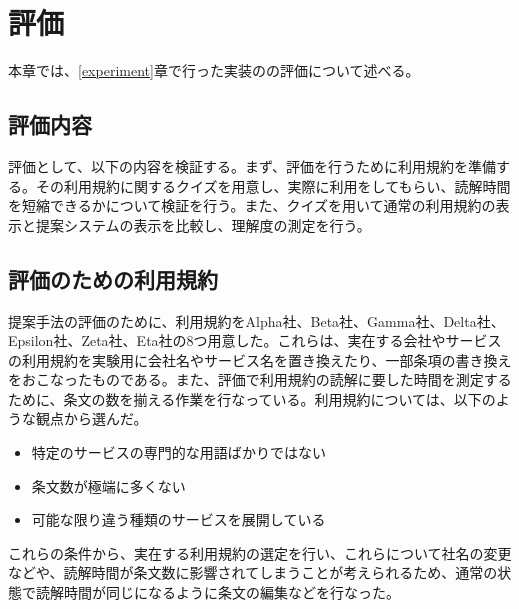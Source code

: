 \chapter{評価}
\label{discussion}
本章では、\ref{experiment}章で行った実装のの評価について述べる。

\section{評価内容}
評価として、以下の内容を検証する。まず、評価を行うために利用規約を準備する。その利用規約に関するクイズを用意し、実際に利用をしてもらい、読解時間を短縮できるかについて検証を行う。また、クイズを用いて通常の利用規約の表示と提案システムの表示を比較し、理解度の測定を行う。

\section{評価のための利用規約}
\label{sec:評価のための利用規約}
提案手法の評価のために、利用規約をAlpha社、Beta社、Gamma社、Delta社、Epsilon社、Zeta社、Eta社の8つ用意した。これらは、実在する会社やサービスの利用規約を実験用に会社名やサービス名を置き換えたり、一部条項の書き換えをおこなったものである。また、評価で利用規約の読解に要した時間を測定するために、条文の数を揃える作業を行なっている。利用規約については、以下のような観点から選んだ。
\begin{itemize}
  \item 特定のサービスの専門的な用語ばかりではない
  \item 条文数が極端に多くない
  \item 可能な限り違う種類のサービスを展開している
\end{itemize}
これらの条件から、実在する利用規約の選定を行い、これらについて社名の変更などや、読解時間が条文数に影響されてしまうことが考えられるため、通常の状態で読解時間が同じになるように条文の編集などを行なった。

